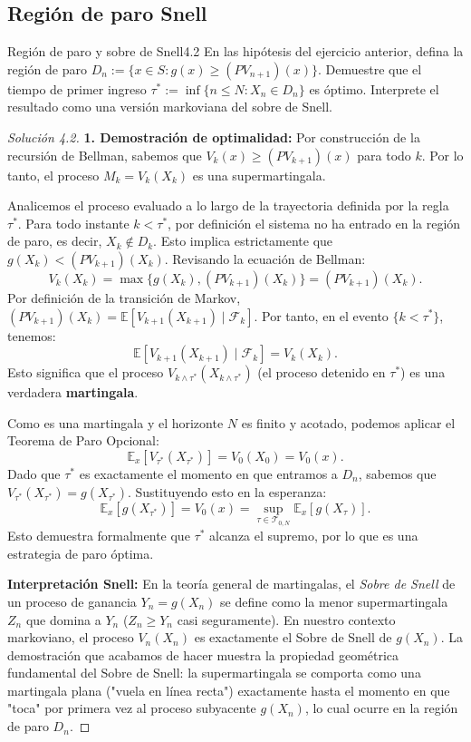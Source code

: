 \documentclass[10pt,a4paper]{article}
\begin{document}
\newpage
\subsection{Región de paro Snell}

\begin{ejercicio}{Región de paro y sobre de Snell}{4.2}
    En las hipótesis del ejercicio anterior, 
    defina la región de paro 
    $D_n := \{x \in S : g(x) \ge (PV_{n+1})(x)\}$. 
    Demuestre que el tiempo de primer ingreso 
    $\tau^* := \inf\{n \le N : X_n \in D_n\}$ 
    es óptimo. Interprete el resultado como una versión 
    markoviana del sobre de Snell.
\end{ejercicio}

\begin{proof}[Solución 4.2]
    \textbf{1. Demostración de optimalidad:}
    Por construcción de la recursión de Bellman, sabemos que $V_k(x) \ge (PV_{k+1})(x)$ para todo $k$. Por lo tanto, el proceso $M_k = V_k(X_k)$ es una supermartingala.
    
    Analicemos el proceso evaluado a lo largo de la trayectoria definida por la regla $\tau^*$. 
    Para todo instante $k < \tau^*$, por definición el sistema no ha entrado en la región de paro, es decir, $X_k \notin D_k$.
    Esto implica estrictamente que $g(X_k) < (PV_{k+1})(X_k)$. 
    Revisando la ecuación de Bellman:
    \[ V_k(X_k) = \max\{g(X_k), (PV_{k+1})(X_k)\} = (PV_{k+1})(X_k). \]
    Por definición de la transición de Markov, $(PV_{k+1})(X_k) = \mathbb{E}[V_{k+1}(X_{k+1}) \mid \mathcal{F}_k]$.
    Por tanto, en el evento $\{k < \tau^*\}$, tenemos:
    \[ \mathbb{E}[V_{k+1}(X_{k+1}) \mid \mathcal{F}_k] = V_k(X_k). \]
    Esto significa que el proceso $V_{k \land \tau^*}(X_{k \land \tau^*})$ (el proceso detenido en $\tau^*$) es una verdadera \textbf{martingala}.

    Como es una martingala y el horizonte $N$ es finito y acotado, podemos aplicar el Teorema de Paro Opcional:
    \[ \mathbb{E}_x[V_{\tau^*}(X_{\tau^*})] = V_0(X_0) = V_0(x). \]
    Dado que $\tau^*$ es exactamente el momento en que entramos a $D_n$, sabemos que $V_{\tau^*}(X_{\tau^*}) = g(X_{\tau^*})$. Sustituyendo esto en la esperanza:
    \[ \mathbb{E}_x[g(X_{\tau^*})] = V_0(x) = \sup_{\tau \in \mathcal{T}_{0,N}} \mathbb{E}_x[g(X_\tau)]. \]
    Esto demuestra formalmente que $\tau^*$ alcanza el supremo, por lo que es una estrategia de paro óptima.

    \textbf{Interpretación Snell:}
    En la teoría general de martingalas, el \textit{Sobre de Snell} de un proceso de ganancia $Y_n = g(X_n)$ se define como la menor supermartingala $Z_n$ que domina a $Y_n$ ($Z_n \ge Y_n$ casi seguramente). 
    En nuestro contexto markoviano, el proceso $V_n(X_n)$ es exactamente el Sobre de Snell de $g(X_n)$.
    La demostración que acabamos de hacer muestra la propiedad geométrica fundamental del Sobre de Snell: la supermartingala se comporta como una martingala plana ("vuela en línea recta") exactamente hasta el momento en que "toca" por primera vez al proceso subyacente $g(X_n)$, lo cual ocurre en la región de paro $D_n$.
\end{proof}
\end{document}

